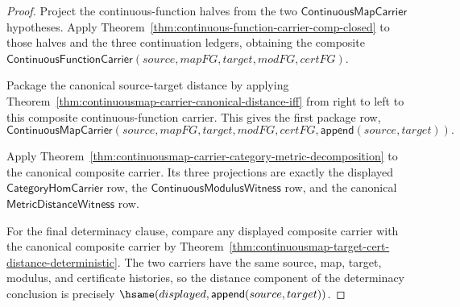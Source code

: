 \begin{proof}
Project the continuous-function halves from the two
$\mathsf{ContinuousMapCarrier}$ hypotheses. Apply
Theorem~\ref{thm:continuous-function-carrier-comp-closed} to those halves and
the three continuation ledgers, obtaining the composite
$\mathsf{ContinuousFunctionCarrier}(source,mapFG,target,modFG,certFG)$.

Package the canonical source-target distance by applying
Theorem~\ref{thm:continuousmap-carrier-canonical-distance-iff} from right to
left to this composite continuous-function carrier. This gives the first
package row,
$$
\mathsf{ContinuousMapCarrier}
(source,mapFG,target,modFG,certFG,\mathsf{append}(source,target)).
$$

Apply
Theorem~\ref{thm:continuousmap-carrier-category-metric-decomposition} to the
canonical composite carrier. Its three projections are exactly the displayed
$\mathsf{CategoryHomCarrier}$ row, the
$\mathsf{ContinuousModulusWitness}$ row, and the canonical
$\mathsf{MetricDistanceWitness}$ row.

For the final determinacy clause, compare any displayed composite carrier
with the canonical composite carrier by
Theorem~\ref{thm:continuousmap-target-cert-distance-deterministic}. The two
carriers have the same source, map, target, modulus, and certificate histories,
so the distance component of the determinacy conclusion is precisely
$\hsame(displayed,\mathsf{append}(source,target))$.
\end{proof}
